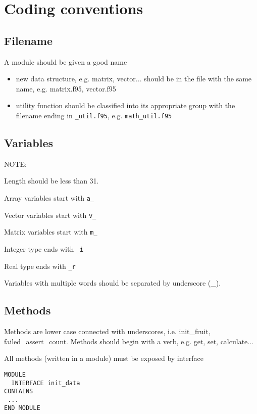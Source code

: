 
\chapter{Coding conventions}
\label{chap:coding-conventions}

\section{Filename}
\label{sec:filename}

A module should be given a good name
\begin{itemize}
\item new data structure, e.g. matrix, vector... should be in the file
  with the same name, e.g. matrix.f95, vector.f95

\item utility function should be classified into its appropriate group
  with the filename ending in \lstinline!_util.f95!,
  e.g. \lstinline!math_util.f95!
\end{itemize}

\section{Variables}
\label{sec:variables}
NOTE:

Length should be less than 31.

Array variables start with \lstinline!a_!

Vector variables start with \lstinline!v_!

Matrix variables start with \lstinline!m_!

Integer type ends with \verb!_i!

Real type ends with  \verb!_r!

Variables with multiple words should be separated by underscore (\_).

\section{Methods}
\label{sec:methods}

Methods are lower case connected with underscores, i.e. init\_fruit,
failed\_assert\_count. Methods should begin with a verb, e.g. get,
set, calculate...

All methods (written in a module) must be exposed by interface
\begin{lstlisting}
MODULE 
  INTERFACE init_data
CONTAINS
 ...
END MODULE
\end{lstlisting}

